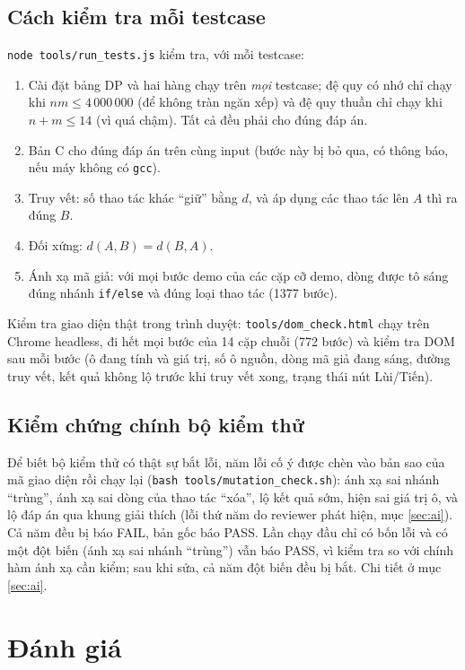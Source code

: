 \documentclass[12pt,a4paper]{article}
\newcommand{\code}[1]{\texttt{#1}}
\begin{document}
\subsection{Cách kiểm tra mỗi testcase}
\texttt{node tools/run\_tests.js} kiểm tra, với mỗi testcase:
\begin{enumerate}[nosep]
  \item Cài đặt bảng DP và hai hàng chạy trên \emph{mọi} testcase; đệ quy có nhớ chỉ chạy khi $nm\le 4\,000\,000$ (để không tràn ngăn xếp) và đệ quy thuần chỉ chạy khi $n+m\le 14$ (vì quá chậm). Tất cả đều phải cho đúng đáp án.
  \item Bản C cho đúng đáp án trên cùng input (bước này bị bỏ qua, có thông báo, nếu máy không có \code{gcc}).
  \item Truy vết: số thao tác khác ``giữ'' bằng $d$, và áp dụng các thao tác lên $A$ thì ra đúng $B$.
  \item Đối xứng: $d(A,B)=d(B,A)$.
  \item Ánh xạ mã giả: với mọi bước demo của các cặp cỡ demo, dòng được tô sáng đúng nhánh \code{if/else} và đúng loại thao tác (1377 bước).
\end{enumerate}
Kiểm tra giao diện thật trong trình duyệt: \code{tools/dom\_check.html} chạy trên Chrome headless, đi hết mọi bước của 14 cặp chuỗi (772 bước) và kiểm tra DOM sau mỗi bước (ô đang tính và giá trị, số ô nguồn, dòng mã giả đang sáng, đường truy vết, kết quả không lộ trước khi truy vết xong, trạng thái nút Lùi/Tiến).

\subsection{Kiểm chứng chính bộ kiểm thử}
Để biết bộ kiểm thử có thật sự bắt lỗi, năm lỗi cố ý được chèn vào bản sao của mã giao diện rồi chạy lại (\code{bash tools/mutation\_check.sh}): ánh xạ sai nhánh ``trùng'', ánh xạ sai dòng của thao tác ``xóa'', lộ kết quả sớm, hiện sai giá trị ô, và lộ đáp án qua khung giải thích (lỗi thứ năm do reviewer phát hiện, mục \ref{sec:ai}). Cả năm đều bị báo FAIL, bản gốc báo PASS. Lần chạy đầu chỉ có bốn lỗi và có một đột biến (ánh xạ sai nhánh ``trùng'') vẫn báo PASS, vì kiểm tra so với chính hàm ánh xạ cần kiểm; sau khi sửa, cả năm đột biến đều bị bắt. Chi tiết ở mục \ref{sec:ai}.

\section{Đánh giá}
\end{document}
